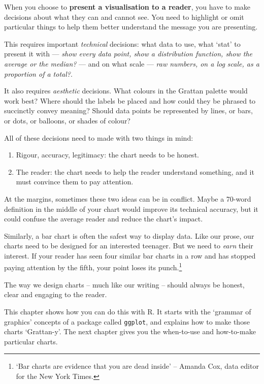 \documentclass[]{book}
\providecommand{\tightlist}{%
  \setlength{\itemsep}{0pt}\setlength{\parskip}{0pt}}
\let\rmarkdownfootnote\footnote%
\def\footnote{\protect\rmarkdownfootnote}
\begin{document}
When you choose to \textbf{present a visualisation to a reader}, you have to make decisions about what they can and cannot see. You need to highlight or omit particular things to help them better understand the message you are presenting.

This requires important \emph{technical} decisions: what data to use, what `stat' to present it with --- \emph{show every data point, show a distribution function, show the average or the median?} --- and on what scale --- \emph{raw numbers, on a log scale, as a proportion of a total?}.

It also requires \emph{aesthetic} decisions. What colours in the Grattan palette would work best? Where should the labels be placed and how could they be phrased to succinctly convey meaning? Should data points be represented by lines, or bars, or dots, or balloons, or shades of colour?

All of these decisions need to made with two things in mind:

\begin{enumerate}
\def\labelenumi{\arabic{enumi}.}
\tightlist
\item
  Rigour, accuracy, legitimacy: the chart needs to be honest.
\item
  The reader: the chart needs to help the reader understand something, and it must convince them to pay attention.
\end{enumerate}

At the margins, sometimes these two ideas can be in conflict. Maybe a 70-word definition in the middle of your chart would improve its technical accuracy, but it could confuse the average reader and reduce the chart's impact.

Similarly, a bar chart is often the safest way to display data. Like our prose, our charts need to be designed for an interested teenager. But we need to \emph{earn} their interest. If your reader has seen four similar bar charts in a row and has stopped paying attention by the fifth, your point loses its punch.\footnote{`Bar charts are evidence that you are dead inside' -- Amanda Cox, data editor for the New York Times.}

The way we design charts -- much like our writing -- should always be honest, clear and engaging to the reader.

This chapter shows how you can do this with R. It starts with the `grammar of graphics' concepts of a package called \texttt{ggplot}, and explains how to make those charts `Grattan-y'. The next chapter gives you the when-to-use and how-to-make particular charts.
\end{document}

